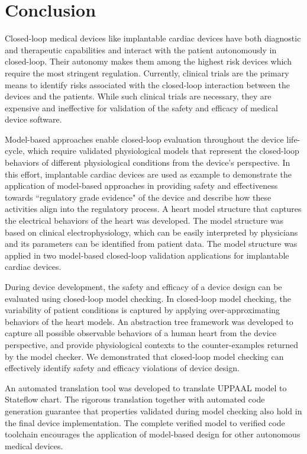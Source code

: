 \chapter{Conclusion}
Closed-loop medical devices like implantable cardiac devices have both diagnostic and therapeutic capabilities and interact with the patient autonomously in closed-loop. 
Their autonomy makes them among the highest risk devices which require the most stringent regulation. 
Currently, clinical trials are the primary means to identify risks associated with the closed-loop interaction between the devices and the patients. 
While such clinical trials are necessary, they are expensive and ineffective for validation of the safety and efficacy of medical device software. 

Model-based approaches enable closed-loop evaluation throughout the device life-cycle, which require validated physiological models that represent the closed-loop behaviors of different physiological conditions from the device's perspective. 
In this effort, implantable cardiac devices are used as example to demonstrate the application of model-based approaches in providing safety and effectiveness towards ``regulatory grade evidence" of the device and describe how these activities align into the regulatory process. 
A heart model structure that captures the electrical behaviors of the heart was developed.
The model structure was based on clinical electrophysiology, which can be easily interpreted by physicians and its parameters can be identified from patient data.
The model structure was applied in two model-based closed-loop validation applications for implantable cardiac devices.

During device development, the safety and efficacy of a device design can be evaluated using closed-loop model checking.
In closed-loop model checking, the variability of patient conditions is captured by applying over-approximating behaviors of the heart models.
An abstraction tree framework was developed to capture all possible observable behaviors of a human heart from the device perspective, and provide physiological contexts to the counter-examples returned by the model checker.
We demonstrated that closed-loop model checking can effectively identify safety and efficacy violations of device design.

An automated translation tool was developed to translate UPPAAL model to Stateflow chart. 
The rigorous translation together with automated code generation guarantee that properties validated during model checking also hold in the final device implementation.
The complete verified model to verified code toolchain encourages the application of model-based design for other autonomous medical devices.

